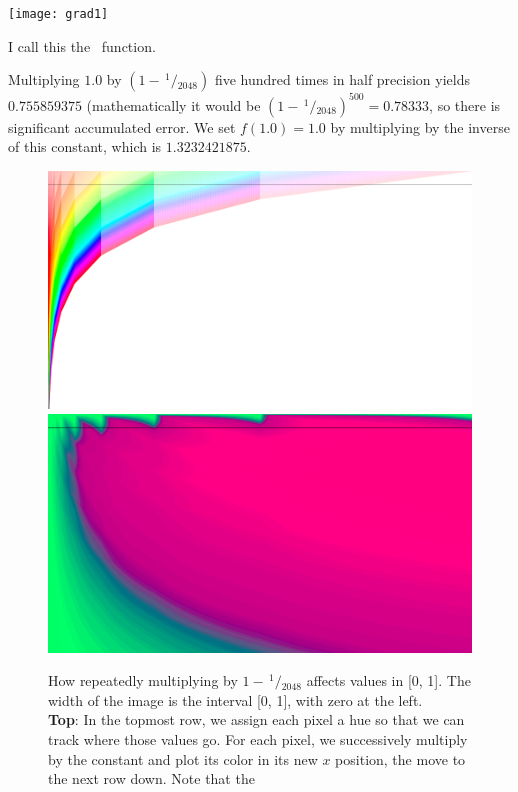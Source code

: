 \documentclass[twocolumn]{article}
\newcommand\sfrac[2]{\!{}\,^{#1}\!/{}\!_{#2}}
\begin{document}
\begin{center}
\texttt{[image: grad1]}
\end{center}

I call this the \gradone\ function.

Multiplying $1.0$ by $(1 - \sfrac{1}{2048})$ five hundred times in
half precision yields $0.755859375$ (mathematically it would be $(1 -
\sfrac{1}{2048})^{500} = 0.78333$, so there is significant accumulated
error. We set $f(1.0) = 1.0$ by multiplying by the inverse of this
constant, which is $1.3232421875$.

\begin{figure}[t!p]
  \begin{center}
    \includegraphics[width=0.85 \linewidth]{rainbow} \\[1em]
    \includegraphics[width=0.85 \linewidth]{rainbow-error}
  \end{center}
  \caption{
    How repeatedly multiplying by $1 - \sfrac{1}{2048}$ affects values in
    [0, 1].
    The width of the image is the interval [0, 1], with zero at the left.
    \\[1em]
    {\bf Top}: In the topmost row, we assign each pixel a hue so that
    we can track where those values go. For each pixel, we
    successively multiply by the constant and plot its color in its
    new $x$ position, the move to the next row down. Note that the
}
\end{figure}
\end{document}
